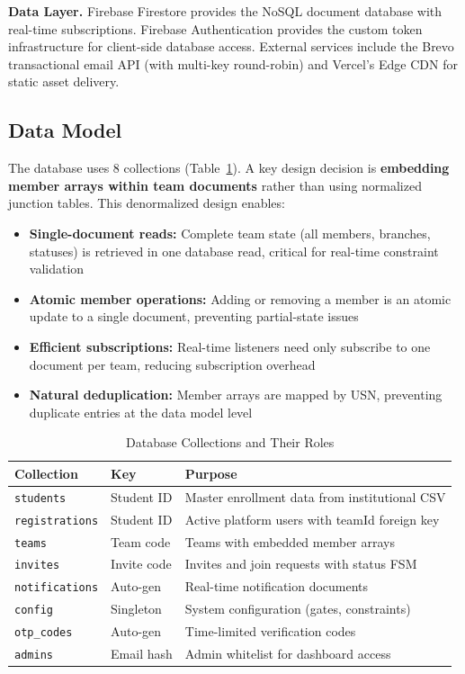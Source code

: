 \documentclass[conference]{IEEEtran}
\begin{document}
\textbf{Data Layer.} Firebase Firestore provides the NoSQL document database with real-time subscriptions. Firebase Authentication provides the custom token infrastructure for client-side database access. External services include the Brevo transactional email API (with multi-key round-robin) and Vercel's Edge CDN for static asset delivery.

\subsection{Data Model}

The database uses 8 collections (Table~\ref{tab:collections}). A key design decision is \textbf{embedding member arrays within team documents} rather than using normalized junction tables. This denormalized design enables:

\begin{itemize}[noitemsep,topsep=3pt]
    \item \textbf{Single-document reads:} Complete team state (all members, branches, statuses) is retrieved in one database read, critical for real-time constraint validation
    \item \textbf{Atomic member operations:} Adding or removing a member is an atomic update to a single document, preventing partial-state issues
    \item \textbf{Efficient subscriptions:} Real-time listeners need only subscribe to one document per team, reducing subscription overhead
    \item \textbf{Natural deduplication:} Member arrays are mapped by USN, preventing duplicate entries at the data model level
\end{itemize}

\begin{table}[htbp]
\centering
\caption{Database Collections and Their Roles}
\label{tab:collections}
\footnotesize
\renewcommand{\arraystretch}{1.15}
\begin{tabular}{@{}lp{1.5cm}p{3cm}@{}}
\toprule
\textbf{Collection} & \textbf{Key} & \textbf{Purpose} \\
\midrule
\texttt{students} & Student ID & Master enrollment data from institutional CSV \\
\texttt{registrations} & Student ID & Active platform users with teamId foreign key \\
\texttt{teams} & Team code & Teams with embedded member arrays \\
\texttt{invites} & Invite code & Invites and join requests with status FSM \\
\texttt{notifications} & Auto-gen & Real-time notification documents \\
\texttt{config} & Singleton & System configuration (gates, constraints) \\
\texttt{otp\_codes} & Auto-gen & Time-limited verification codes \\
\texttt{admins} & Email hash & Admin whitelist for dashboard access \\
\bottomrule
\end{tabular}
\end{table}
\end{document}
